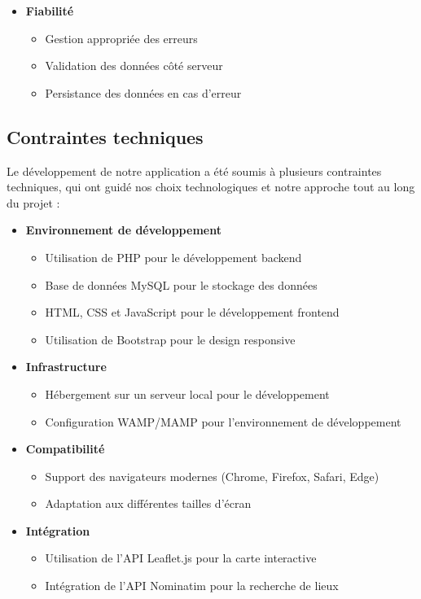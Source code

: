 \documentclass[a4paper,12pt]{article}
\begin{document}
\begin{itemize}
  \item \textbf{Fiabilité}
  \begin{itemize}
    \item Gestion appropriée des erreurs
    \item Validation des données côté serveur
    \item Persistance des données en cas d'erreur
  \end{itemize}
\end{itemize}

\subsection{Contraintes techniques}

Le développement de notre application a été soumis à plusieurs contraintes techniques, qui ont guidé nos choix technologiques et notre approche tout au long du projet :

\begin{itemize}
  \item \textbf{Environnement de développement}
  \begin{itemize}
    \item Utilisation de PHP pour le développement backend
    \item Base de données MySQL pour le stockage des données
    \item HTML, CSS et JavaScript pour le développement frontend
    \item Utilisation de Bootstrap pour le design responsive
  \end{itemize}

  \item \textbf{Infrastructure}
  \begin{itemize}
    \item Hébergement sur un serveur local pour le développement
    \item Configuration WAMP/MAMP pour l'environnement de développement
  \end{itemize}

  \item \textbf{Compatibilité}
  \begin{itemize}
    \item Support des navigateurs modernes (Chrome, Firefox, Safari, Edge)
    \item Adaptation aux différentes tailles d'écran
  \end{itemize}

  \item \textbf{Intégration}
  \begin{itemize}
    \item Utilisation de l'API Leaflet.js pour la carte interactive
    \item Intégration de l'API Nominatim pour la recherche de lieux
  \end{itemize}
\end{itemize}
\end{document}
